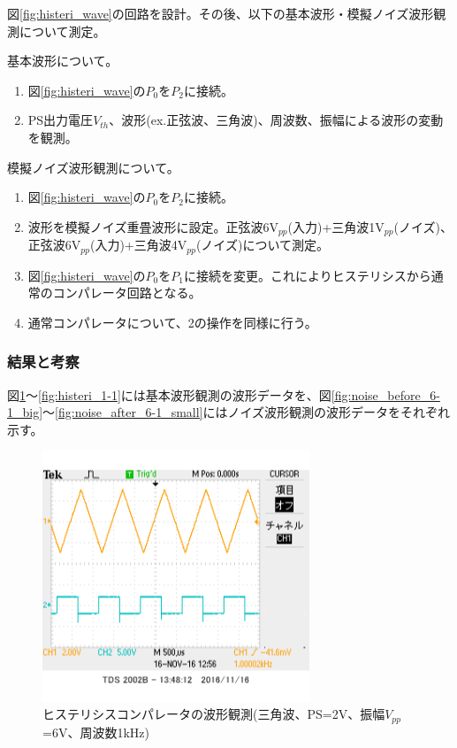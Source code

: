 \documentclass[11pt,a4j]{jsarticle}
\begin{document}
    図\ref{fig:histeri_wave}の回路を設計。その後、以下の基本波形・模擬ノイズ波形観測について測定。
    
    基本波形について。
    \begin{enumerate}
    \item 図\ref{fig:histeri_wave}の$P_0$を$P_2$に接続。
    \item PS出力電圧$V_{th}$、波形(ex.正弦波、三角波)、周波数、振幅による波形の変動を観測。
    \end{enumerate}
    
    模擬ノイズ波形観測について。
    \begin{enumerate}
    \item 図\ref{fig:histeri_wave}の$P_0$を$P_2$に接続。
    \item 波形を模擬ノイズ重畳波形に設定。正弦波6V$_{pp}$(入力)+三角波1V$_{pp}$(ノイズ)、正弦波6V$_{pp}$(入力)+三角波4V$_{pp}$(ノイズ)について測定。
    \item 図\ref{fig:histeri_wave}の$P_0$を$P_1$に接続を変更。これによりヒステリシスから通常のコンパレータ回路となる。
    \item 通常コンパレータについて、2の操作を同様に行う。
    \end{enumerate}
    
   \subsubsection{結果と考察} \label{sec:histeri}
    
    図\ref{fig:histeri_2-1}～\ref{fig:histeri_1-1}には基本波形観測の波形データを、図\ref{fig:noise_before_6-1_big}～\ref{fig:noise_after_6-1_small}にはノイズ波形観測の波形データをそれぞれ示す。
    
    \begin{figure}[htbp]
  \centering
  \includegraphics[width=8cm,clip]{1_2_histeri_Vth2f1V6sankaku_ViVo.png}
  \caption{ヒステリシスコンパレータの波形観測(三角波、PS=2V、振幅$V_{pp}$=6V、周波数1kHz)}
  \label{fig:histeri_2-1}
 \end{figure}
 
\end{document}
